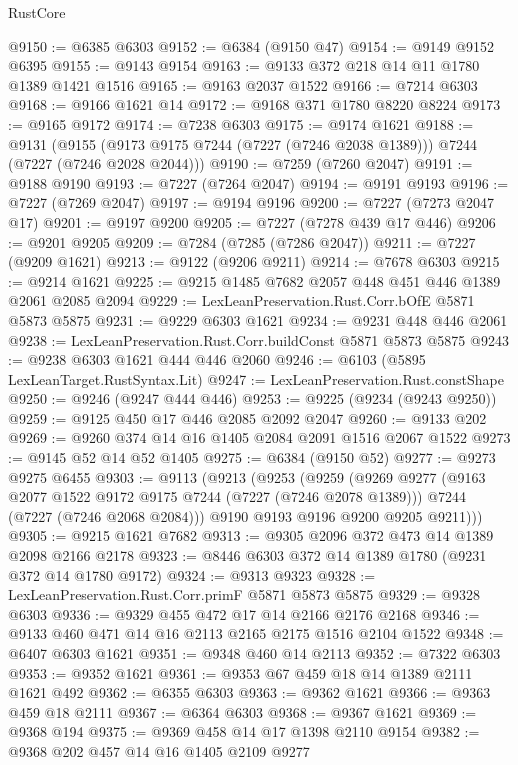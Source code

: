 \begin{lexlean}{RustCore}
\begin{coremodule}
@9150 := @6385 @6303
@9152 := @6384 (@9150 @47)
@9154 := @9149 @9152 @6395
@9155 := @9143 @9154
@9163 := @9133 @372 @218 @14 @11 @1780 @1389 @1421 @1516
@9165 := @9163 @2037 @1522
@9166 := @7214 @6303
@9168 := @9166 @1621 @14
@9172 := @9168 @371 @1780 @8220 @8224
@9173 := @9165 @9172
@9174 := @7238 @6303
@9175 := @9174 @1621
@9188 := @9131
    (@9155 (@9173 @9175 @7244 (@7227 (@7246 @2038 @1389))) @7244 (@7227 (@7246 @2028 @2044)))
@9190 := @7259 (@7260 @2047)
@9191 := @9188 @9190
@9193 := @7227 (@7264 @2047)
@9194 := @9191 @9193
@9196 := @7227 (@7269 @2047)
@9197 := @9194 @9196
@9200 := @7227 (@7273 @2047 @17)
@9201 := @9197 @9200
@9205 := @7227 (@7278 @439 @17 @446)
@9206 := @9201 @9205
@9209 := @7284 (@7285 (@7286 @2047))
@9211 := @7227 (@9209 @1621)
@9213 := @9122 (@9206 @9211)
@9214 := @7678 @6303
@9215 := @9214 @1621
@9225 := @9215 @1485 @7682 @2057 @448 @451 @446 @1389 @2061 @2085 @2094
@9229 := LexLeanPreservation.Rust.Corr.bOfE @5871 @5873 @5875
@9231 := @9229 @6303 @1621
@9234 := @9231 @448 @446 @2061
@9238 := LexLeanPreservation.Rust.Corr.buildConst @5871 @5873 @5875
@9243 := @9238 @6303 @1621 @444 @446 @2060
@9246 := @6103 (@5895 LexLeanTarget.RustSyntax.Lit)
@9247 := LexLeanPreservation.Rust.constShape
@9250 := @9246 (@9247 @444 @446)
@9253 := @9225 (@9234 (@9243 @9250))
@9259 := @9125 @450 @17 @446 @2085 @2092 @2047
@9260 := @9133 @202
@9269 := @9260 @374 @14 @16 @1405 @2084 @2091 @1516 @2067 @1522
@9273 := @9145 @52 @14 @52 @1405
@9275 := @6384 (@9150 @52)
@9277 := @9273 @9275 @6455
@9303 := @9113
    (@9213
      (@9253
        (@9259
          (@9269
            @9277
            (@9163 @2077 @1522 @9172 @9175 @7244 (@7227 (@7246 @2078 @1389)))
            @7244
            (@7227 (@7246 @2068 @2084)))
          @9190
          @9193
          @9196
          @9200
          @9205
          @9211)))
@9305 := @9215 @1621 @7682
@9313 := @9305 @2096 @372 @473 @14 @1389 @2098 @2166 @2178
@9323 := @8446 @6303 @372 @14 @1389 @1780 (@9231 @372 @14 @1780 @9172)
@9324 := @9313 @9323
@9328 := LexLeanPreservation.Rust.Corr.primF @5871 @5873 @5875
@9329 := @9328 @6303
@9336 := @9329 @455 @472 @17 @14 @2166 @2176 @2168
@9346 := @9133 @460 @471 @14 @16 @2113 @2165 @2175 @1516 @2104 @1522
@9348 := @6407 @6303 @1621
@9351 := @9348 @460 @14 @2113
@9352 := @7322 @6303
@9353 := @9352 @1621
@9361 := @9353 @67 @459 @18 @14 @1389 @2111 @1621 @492
@9362 := @6355 @6303
@9363 := @9362 @1621
@9366 := @9363 @459 @18 @2111
@9367 := @6364 @6303
@9368 := @9367 @1621
@9369 := @9368 @194
@9375 := @9369 @458 @14 @17 @1398 @2110 @9154
@9382 := @9368 @202 @457 @14 @16 @1405 @2109 @9277

\end{coremodule}
\end{lexlean}
